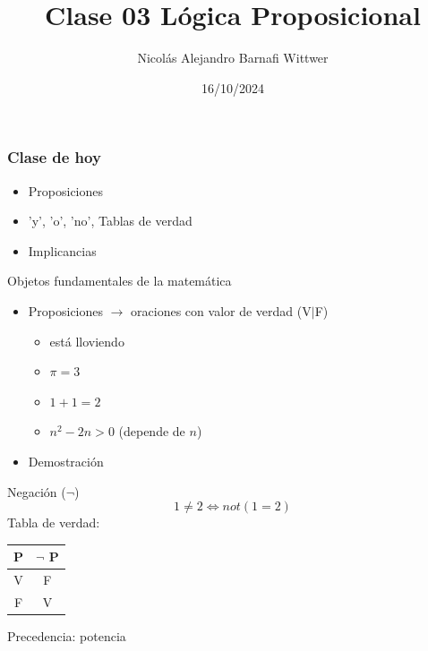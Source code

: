 \documentclass[14pt,aspectratio=169,xcolor=dvipsnames]{beamer}
\title[short title]{Clase 03 Lógica Proposicional}
\subtitle{}
\author[NA Barnafi] {Nicolás Alejandro Barnafi Wittwer}
\institute[UC|CMM] 
{
    Pontificia Universidad Católica de Chile \\
    Centro de Modelamiento Matemático
}
\date{16/10/2024}
\begin{document}
\begin{frame}
    \maketitle
\end{frame}
\begin{frame}\frametitle{Clase de hoy}
    \begin{itemize}
        \item Proposiciones
        \item 'y', 'o', 'no', Tablas de verdad
        \item Implicancias
    \end{itemize}

    \vspace{1cm}
\end{frame}
\begin{frame}{Objetos fundamentales de la matemática}
    \begin{itemize}
        \item Proposiciones $\to$ oraciones con valor de verdad (V$|$F)
            \begin{itemize}
                \item está lloviendo
                \item $\pi=3$
                \item $1+1=2$
                \item $n^2 -2n >0$ (depende de $n$)
            \end{itemize}
        \item Demostración
    \end{itemize}
\end{frame}
\begin{frame}{Negación ($\neg$)}
    $$ 1\neq 2 \Leftrightarrow  not( 1 = 2 )$$
    Tabla de verdad:
        \begin{center}
            \begin{tabular}{c | c}
                \toprule P & $\neg $ P  \\\midrule
                V & F \\
                F & V \\ \bottomrule
            \end{tabular}
        \end{center}
    Precedencia: potencia
\end{frame}
\end{document}
